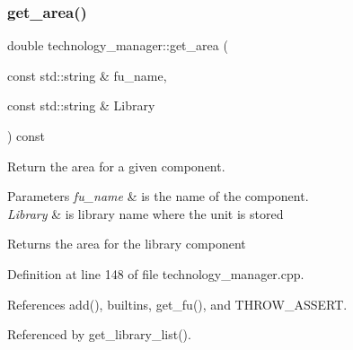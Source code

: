 \subsubsection{\texorpdfstring{get\+\_\+area()}{get\_area()}}
{\footnotesize\ttfamily double technology\+\_\+manager\+::get\+\_\+area (\begin{DoxyParamCaption}\item[{const std\+::string \&}]{fu\+\_\+name,  }\item[{const std\+::string \&}]{Library }\end{DoxyParamCaption}) const}



Return the area for a given component. 


\begin{DoxyParams}{Parameters}
{\em fu\+\_\+name} & is the name of the component. \\
\hline
{\em Library} & is library name where the unit is stored \\
\hline
\end{DoxyParams}
\begin{DoxyReturn}{Returns}
the area for the library component 
\end{DoxyReturn}


Definition at line 148 of file technology\+\_\+manager.\+cpp.



References add(), builtins, get\+\_\+fu(), and T\+H\+R\+O\+W\+\_\+\+A\+S\+S\+E\+RT.



Referenced by get\+\_\+library\+\_\+list().

